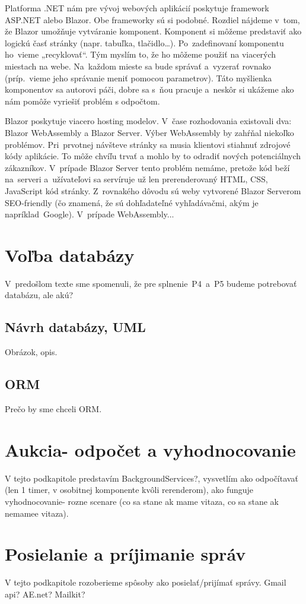 Platforma .NET nám pre vývoj webových aplikácií poskytuje framework\\ASP.NET alebo Blazor. Obe frameworky sú si podobné. Rozdiel náj\-de\-me v~tom, že Blazor umožňuje vytváranie komponent. Komponent si môžeme predstaviť ako logickú časť stránky (napr. tabuľka, tlačidlo\dots). Po~zadefinovaní komponentu ho~vieme „recyklovať“. Tým myslím to, že ho môžeme použiť na viacerých miestach na webe. Na~každom mieste sa bude správať a~vyzerať rovnako (príp.~vie\-me  jeho správanie meniť pomocou parametrov). Táto myšlienka komponentov sa autorovi páči, dobre sa s~ňou pracuje a~neskôr si ukážeme ako nám pomôže vyriešiť problém s odpočtom.

Blazor poskytuje viacero hosting modelov. V~čase rozhodovania existovali dva: Blazor WebAssembly a Blazor Server. Výber WebAssembly by zahŕňal niekoľko problémov. Pri~prvotnej návšteve stránky sa musia klientovi stiahnuť zdrojové kódy aplikácie. To môže chvíľu trvať a mohlo by to odradiť nových potenciálnych zákazníkov. V~prípade Blazor Server tento problém nemáme, pretože kód beží na~serveri a~užívateľovi sa servíruje už len prerenderovaný HTML, CSS, JavaScript kód stránky. Z~rovnakého dôvodu sú weby vytvorené Blazor Ser\-ve\-rom SEO-friendly (čo znamená, že sú dohľadateľné vyhľadávačmi, akým je napríklad~Google). V~prípade WebAssembly...

\section{Voľba databázy}

V~predošlom texte sme spomenuli, že pre splnenie~P4~a~P5 budeme potrebovať databázu, ale akú?

\subsection{Návrh databázy, UML}

Obrázok, opis.

\subsection{ORM}

Prečo by sme chceli ORM.

\section{Aukcia- odpočet a vyhodnocovanie}

V tejto podkapitole predstavím BackgroundServices?, vysvetlím ako odpočítavať (len 1 timer, v osobitnej komponente kvôli rerenderom), ako funguje vyhodnocovanie- rozne scenare (co sa stane ak mame vitaza, co sa stane ak nemamee vitaza).

\section{Posielanie a príjimanie správ}

V tejto podkapitole rozoberieme spôsoby ako posielať/prijímať správy. Gmail api? AE.net? Mailkit?
